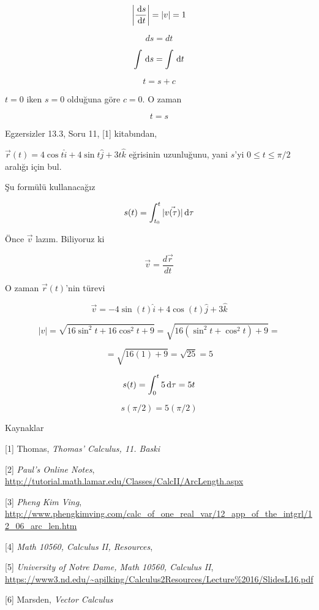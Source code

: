 \documentclass[12pt,fleqn]{article}\usepackage{../../common}
\begin{document}
$$ \bigg|\frac{\,\mathrm{d} s}{\,\mathrm{d} t}\bigg| = |v| = 1 $$

$$ ds = dt $$

$$ \int \,\mathrm{d} s = \int \,\mathrm{d} t $$

$$ t = s + c $$

$t=0$ iken $s=0$ olduğuna göre $c=0$. O zaman 

$$ t = s $$

Egzersizler 13.3, Soru 11, [1] kitabından,

$\vec{r} (t) = 4 \cos t \hat{i} + 4 \sin t \hat{j} + 3t \hat{k}$ 
eğrisinin uzunluğunu, yani $s$'yi  $0 \le t \le \pi / 2$ 
aralığı için bul. 

Şu formülü kullanacağız

$$ s(t) = \int_{t_0}^t |\vec{v(\tau)}| \,\mathrm{d}\tau  $$

Önce $\vec{v}$ lazım. Biliyoruz ki

$$ \vec{v} = \frac{d\vec{r}}{dt} $$

O zaman $\vec{r}(t)$'nin türevi

$$ \vec{v} = -4\sin(t)\hat{i} + 4\cos(t)\hat{j} + 3\hat{k} $$

$$ |v| = \sqrt{16\sin^2t + 16\cos^2t  + 9} = 
\sqrt{16(\sin^2t + \cos^2t) + 9} = 
 $$

$$ = \sqrt{16(1) + 9} = \sqrt{25} = 5 $$

$$ s(t) = \int_0^t 5 \,\mathrm{d} \tau = 
5t 
$$

$$ s(\pi / 2) = 5(\pi/2) $$

Kaynaklar

[1] Thomas, {\em Thomas' Calculus, 11. Baski}

[2] {\em Paul's Online Notes},
    \url{http://tutorial.math.lamar.edu/Classes/CalcII/ArcLength.aspx}

[3] {\em Pheng Kim Ving},
    \url{http://www.phengkimving.com/calc_of_one_real_var/12_app_of_the_intgrl/12_06_arc_len.htm}

[4] {\em Math 10560, Calculus II, Resources}, 
    
[5] {\em University of Notre Dame, Math 10560, Calculus II},
    \url{https://www3.nd.edu/~apilking/Calculus2Resources/Lecture%2016/SlidesL16.pdf}

[6] Marsden, {\em Vector Calculus}
      
\end{document}
